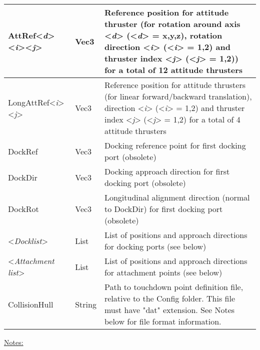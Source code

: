 \documentclass[Orbiter Developer Manual.tex]{subfiles}
\begin{document}
\begin{longtable}{ |p{}|p{}|p{}| }
	\hline\rule{0pt}{2ex}
	AttRef<\textit{d}><\textit{i}><\textit{j}> & Vec3 & Reference position for attitude thruster (for rotation around axis <\textit{d}> (<\textit{d}> = x,y,z), rotation direction <\textit{i}> (<\textit{i}> = 1,2) and thruster index <\textit{j}> (<\textit{j}> = 1,2)) for a total of 12 attitude thrusters\\
	\hline\rule{0pt}{2ex}
	LongAttRef<\textit{i}><\textit{j}> & Vec3 & Reference position for attitude thrusters (for linear forward/backward translation), direction <\textit{i}> (<\textit{i}> = 1,2) and thruster index <\textit{j}> (<\textit{j}> = 1,2) for a total of 4 attitude thrusters\\
	\hline\rule{0pt}{2ex}
	DockRef & Vec3 & Docking reference point for first docking port (obsolete)\\
	\hline\rule{0pt}{2ex}
	DockDir & Vec3 & Docking approach direction for first docking port (obsolete)\\
	\hline\rule{0pt}{2ex}
	DockRot & Vec3 & Longitudinal alignment direction (normal to DockDir) for first docking port (obsolete)\\
	\hline\rule{0pt}{2ex}
	<\textit{Docklist}> & List & List of positions and approach directions for docking ports (see below)\\
	\hline\rule{0pt}{2ex}
	<\textit{Attachment list}> & List & List of positions and approach directions for attachment points (see below)\\
	\hline\rule{0pt}{2ex}
	CollisionHull & String & Path to touchdown point definition file, relative to the Config folder. This file must have "dat" extension. See Notes below for file format information.\\
	\hline
	\end{longtable}

\noindent
\underline{Notes:}
\end{document}
